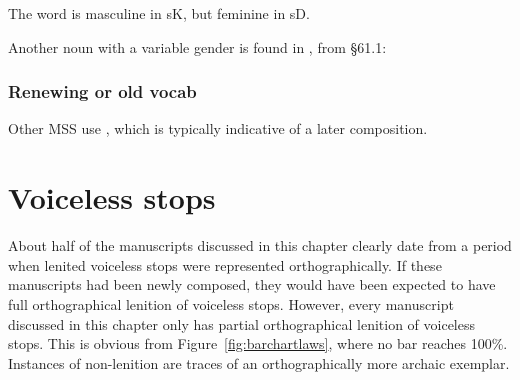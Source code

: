 The word  is masculine in \gls{sK}, but feminine in \gls{sD}.

Another noun with a variable gender  is found in  , from \S 61.1:
\begin{mwl}
\end{mwl}

\subsubsection{Renewing or old vocab}
\label{sec:renewing-or-old}


Other MSS use , which is typically indicative of a later composition.

\section{Voiceless stops}
\label{sec:voiceless-stops}
About half of the manuscripts discussed in this chapter clearly date from a period when lenited voiceless stops were represented orthographically. If these manuscripts had been newly composed, they would have been expected to  have full orthographical lenition of voiceless stops. However, every manuscript discussed in this chapter only has partial orthographical lenition of voiceless stops. This is obvious from Figure~\ref{fig:barchartlaws}, where no bar reaches 100\%. Instances of non-lenition are traces of an orthographically more archaic exemplar.

